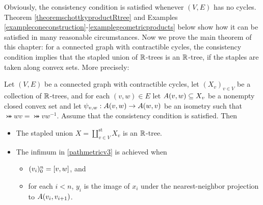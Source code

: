Obviously, the consistency condition is satisfied whenever $(V,E)$ has no cycles. Theorem \ref{theoremschottkyproductRtree} and Examples \ref{exampleconeconstruction}-\ref{examplegeometricproducts} below show how it can be satisfied in many reasonable circumstances. Now we prove the main theorem of this chapter: for a connected graph with contractible cycles, the consistency condition implies that the stapled union of $\R$-trees is an $\R$-tree, if the staples are taken along convex sets. More precisely:

\begin{theorem}
\label{theoremstapledunion}
Let $(V,E)$ be a connected graph with contractible cycles, let $(X_v)_{v\in V}$ be a collection of $\R$-trees, and for each $(v,w)\in E$ let $A(v,w)\subseteq X_v$ be a nonempty closed convex set and let $\psi_{v,w}:A(v,w)\to A(w,v)$ be an isometry such that $\bij wv = \bij vw^{-1}$. Assume that the consistency condition is satisfied. Then
\begin{itemize}
\item[(i)] The stapled union $X = \coprod_{v\in V}^{\text{st}} X_v$ is an $\R$-tree.
\item[(ii)] The infimum in \eqref{pathmetricv3} is achieved when
\begin{itemize}
\item[(a)] $(v_i)_0^n = [v,w]$, and
\item[(b)] for each $i < n$, $y_i$ is the image of $x_i$ under the nearest-neighbor projection to $A(v_i,v_{i + 1})$.
\end{itemize}
\end{itemize}
\end{theorem}
